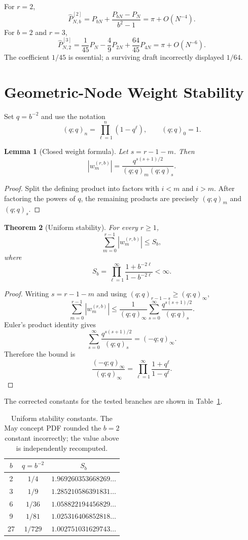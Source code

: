 \documentclass[11pt]{article}
\newtheorem{theorem}{Theorem}[section]
\newtheorem{lemma}[theorem]{Lemma}
\theoremstyle{remark}
\newcommand{\Pacc}{\widehat P}
\begin{document}
For $r=2$,
\[
  \Pacc^{[2]}_{N,b}
  =P_{bN}+\frac{P_{bN}-P_N}{b^2-1}
  =\pi+O(N^{-4}).
\]
For $b=2$ and $r=3$,
\[
  \Pacc^{[3]}_{N,2}
  =\frac{1}{45}P_N-\frac{4}{9}P_{2N}
   +\frac{64}{45}P_{4N}
  =\pi+O(N^{-6}).
\]
The coefficient $1/45$ is essential; a surviving draft incorrectly displayed
$1/64$.

\section{Geometric-Node Weight Stability}

Set $q=b^{-2}$ and use the notation
\[
  (q;q)_n=\prod_{\ell=1}^{n}(1-q^\ell),
  \qquad (q;q)_0=1.
\]

\begin{lemma}[Closed weight formula]
Let $s=r-1-m$.  Then
\[
  |w_m^{(r,b)}|
  =\frac{q^{s(s+1)/2}}{(q;q)_m(q;q)_s}.
\]
\end{lemma}

\begin{proof}
Split the defining product into factors with $i<m$ and $i>m$.  After
factoring the powers of $q$, the remaining products are precisely
$(q;q)_m$ and $(q;q)_s$.
\end{proof}

\begin{theorem}[Uniform stability]
For every $r\ge1$,
\[
  \sum_{m=0}^{r-1}|w_m^{(r,b)}|
  \le S_b,
\]
where
\[
  S_b
  =\prod_{\ell=1}^{\infty}
   \frac{1+b^{-2\ell}}{1-b^{-2\ell}}<\infty.
\]
\end{theorem}

\begin{proof}
Writing $s=r-1-m$ and using $(q;q)_{r-1-s}\ge(q;q)_\infty$,
\[
\sum_{m=0}^{r-1}|w_m^{(r,b)}|
\le\frac{1}{(q;q)_\infty}
\sum_{s=0}^{\infty}\frac{q^{s(s+1)/2}}{(q;q)_s}.
\]
Euler's product identity gives
\[
  \sum_{s=0}^{\infty}\frac{q^{s(s+1)/2}}{(q;q)_s}
  =(-q;q)_\infty.
\]
Therefore the bound is
\[
  \frac{(-q;q)_\infty}{(q;q)_\infty}
  =\prod_{\ell=1}^{\infty}\frac{1+q^\ell}{1-q^\ell}.
\]
\end{proof}

The corrected constants for the tested branches are shown in
Table~\ref{tab:stability}.

\begin{table}[ht]
\centering
\begin{tabular}{ccc}
\toprule
$b$ & $q=b^{-2}$ & $S_b$\\
\midrule
2  & $1/4$   & $1.969260353668269\ldots$\\
3  & $1/9$   & $1.285210586391831\ldots$\\
6  & $1/36$  & $1.058822194456829\ldots$\\
9  & $1/81$  & $1.025316406852818\ldots$\\
27 & $1/729$ & $1.002751031629743\ldots$\\
\bottomrule
\end{tabular}
\caption{Uniform stability constants.  The May concept PDF rounded the
$b=2$ constant incorrectly; the value above is independently recomputed.}
\label{tab:stability}
\end{table}
\end{document}

